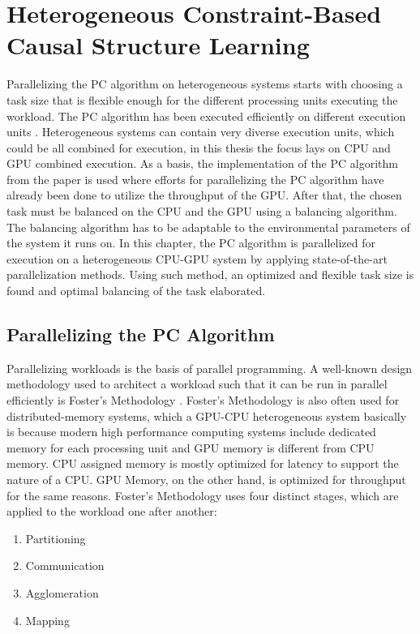 \chapter{Heterogeneous Constraint-Based Causal Structure Learning}
Parallelizing the PC algorithm on heterogeneous systems starts with choosing a task size that is flexible enough for the different processing units executing the workload. The PC algorithm has been executed efficiently on different execution units \cite{leParallelPCPackageEfficient2015,leFastPCAlgorithm2019,schmidtOrderIndependentConstraintBasedCausal2018,zarebavaniCuPCCUDAbasedParallel2018}. Heterogeneous systems can contain very diverse execution units, which could be all combined for execution, in this thesis the focus lays on CPU and GPU combined execution. As a basis, the implementation of the PC algorithm from the paper \cite{schmidtOrderIndependentConstraintBasedCausal2018} is used where efforts for parallelizing the PC algorithm have already been done to utilize the throughput of the GPU. After that, the chosen task must be balanced on the CPU and the GPU using a balancing algorithm. The balancing algorithm has to be adaptable to the environmental parameters of the system it runs on. In this chapter, the PC algorithm is parallelized for execution on a heterogeneous CPU-GPU system by applying state-of-the-art parallelization methods. Using such method, an optimized and flexible task size is found and optimal balancing of the task elaborated.

\section{Parallelizing the PC Algorithm}
Parallelizing workloads is the basis of parallel programming. A well-known design methodology used to architect a workload such that it can be run in parallel efficiently is Foster's Methodology \cite{fosterDesigningBuildingParallel1995}. Foster's Methodology is also often used for distributed-memory systems, which a GPU-CPU heterogeneous system basically is because modern high performance computing systems include dedicated memory for each processing unit and GPU memory is different from CPU memory. CPU assigned memory is mostly optimized for latency to support the nature of a CPU. GPU Memory, on the other hand, is optimized for throughput for the same reasons. Foster's Methodology uses four distinct stages, which are applied to the workload one after another:

\begin{enumerate}
    \item Partitioning
    \item Communication
    \item Agglomeration 
    \item Mapping
\end{enumerate}

